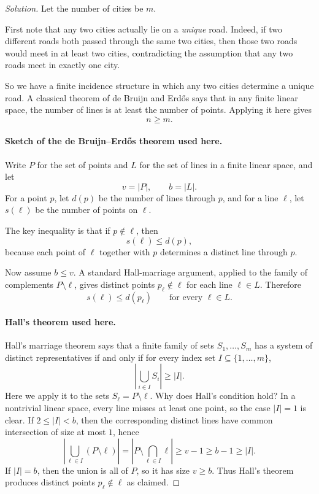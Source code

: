 \documentclass[11pt]{article}
\theoremstyle{definition}
\begin{document}
\begin{proof}[Solution]
Let the number of cities be $m$.

First note that any two cities actually lie on a \emph{unique} road. Indeed, if two different roads both passed through the same two cities, then those two roads would meet in at least two cities, contradicting the assumption that any two roads meet in exactly one city.

So we have a finite incidence structure in which any two cities determine a unique road. A classical theorem of de Bruijn and Erd\H{o}s says that in any finite linear space, the number of lines is at least the number of points. Applying it here gives
\[
n \ge m.
\]

\paragraph{Sketch of the de Bruijn--Erd\H{o}s theorem used here.}
Write $P$ for the set of points and $L$ for the set of lines in a finite linear space, and let
\[
v=|P|, \qquad b=|L|.
\]
For a point $p$, let $d(p)$ be the number of lines through $p$, and for a line $\ell$, let $s(\ell)$ be the number of points on $\ell$.

The key inequality is that if $p\notin \ell$, then
\[
s(\ell) \le d(p),
\]
because each point of $\ell$ together with $p$ determines a distinct line through $p$.

Now assume $b\le v$. A standard Hall-marriage argument, applied to the family of complements $P\setminus \ell$, gives distinct points $p_\ell\notin \ell$ for each line $\ell\in L$. Therefore
\[
s(\ell) \le d(p_\ell) \qquad \text{for every } \ell\in L.
\]

\paragraph{Hall's theorem used here.}
Hall's marriage theorem says that a finite family of sets $S_1,\dots,S_m$ has a system of distinct representatives if and only if for every index set $I\subseteq \{1,\dots,m\}$,
\[
\left|\bigcup_{i\in I} S_i\right| \ge |I|.
\]
Here we apply it to the sets $S_\ell=P\setminus \ell$. Why does Hall's condition hold? In a nontrivial linear space, every line misses at least one point, so the case $|I|=1$ is clear. If $2\le |I|<b$, then the corresponding distinct lines have common intersection of size at most $1$, hence
\[
\left|\bigcup_{\ell\in I}(P\setminus \ell)\right|
= \left|P\setminus \bigcap_{\ell\in I}\ell\right|
\ge v-1
\ge b-1
\ge |I|.
\]
If $|I|=b$, then the union is all of $P$, so it has size $v\ge b$. Thus Hall's theorem produces distinct points $p_\ell\notin \ell$ as claimed.


\end{proof}
\end{document}
